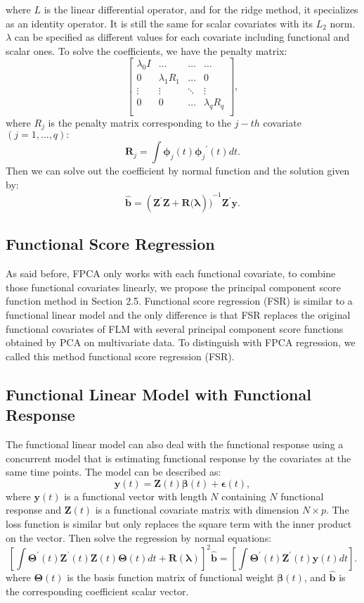 where $L$ is the linear differential operator, and for the ridge method, it specializes as an identity operator. It is still the same for scalar covariates with its $L_2$ norm. $\lambda$ can be specified as different values for each covariate including functional and scalar ones. To solve the coefficients, we have the penalty matrix: \\
$$\left[\begin{matrix}\lambda_0 I &\ldots&\ldots&\ldots\\0&\lambda_1R_1&\ldots&0\\\vdots&\vdots&\ddots&\vdots\\0&0&\ldots&\lambda_qR_q\\\end{matrix}\right],$$
 where $R_j$ is the penalty matrix corresponding to the $j-th$ covariate $(j=1,\ldots,q):$ 
$$\bm{R}_j=\int{\bm{\phi}_j\left(t\right){\bm{\phi}_j}^\prime\left(t\right)dt}.$$
Then we can solve out the coefficient by normal function and the solution given by:$$\hat{\bm{b}}={\left(\bm{Z}^\prime\bm{Z}+\bm{R}(\bm{\lambda}\right))}^{-{1}}\bm{Z}^\prime\bm{y}.$$

\subsection{Functional Score Regression} 
As said before, FPCA only works with each functional covariate, to combine those functional covariates linearly, we propose the principal component score function method in Section 2.5. Functional score regression (FSR) is similar to a functional linear model and the only difference is that FSR replaces the original functional covariates of FLM with several principal component score functions obtained by PCA on multivariate data. To distinguish with FPCA regression, we called this method functional score regression (FSR).

\subsection{Functional Linear Model with Functional Response}
The functional linear model can also deal with the functional response using a concurrent model that is estimating functional response by the covariates at the same time points. The model can be described as:
$$\bm{y}(t)=\bm{Z}\left(t\right)\bm{\beta}(t)+\bm{\epsilon}(t),$$
where $\bm y(t)$ is a functional vector with length $N$ containing $N$ functional response and $\bm Z(t)$ is a functional covariate matrix with dimension $N\times p$. The loss function is similar but only replaces the square term with the inner product on the vector. Then solve the regression by normal equations:
$$\left[\int{\bm{\Theta}^\prime\left(t\right)\bm{Z}^\prime\left(t\right)\bm{Z}\left(t\right)\bm{\Theta}\left(t\right)dt}+\bm{R}\left(\bm{\lambda}\right)\right]^2\hat{\bm{b}}=\left[\int{\bm{\Theta}^\prime\left(t\right)\bm{Z}^\prime\left(t\right)\bm{y}\left(t\right)dt}\right].$$
where $\bm\Theta(t)$ is the basis function matrix of functional weight $\bm \beta(t)$, and  $\hat{\bm b}$ is the corresponding coefficient scalar vector.

